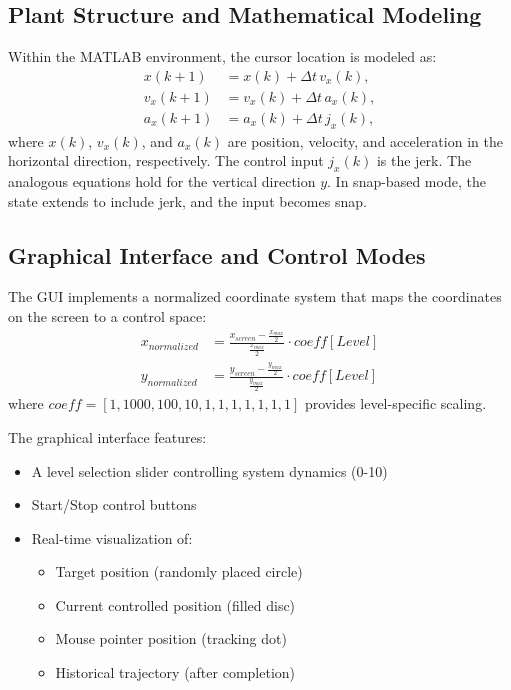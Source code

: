 \documentclass[12pt]{article}
\begin{document}
\subsection{Plant Structure and Mathematical Modeling}
Within the MATLAB environment, the cursor location is modeled as:
\[
\begin{aligned}
x(k+1) &= x(k) + \Delta t \, v_x(k), \\
v_x(k+1) &= v_x(k) + \Delta t \, a_x(k), \\
a_x(k+1) &= a_x(k) + \Delta t \, j_x(k),
\end{aligned}
\]
where $x(k)$, $v_x(k)$, and $a_x(k)$ are position, velocity, and acceleration in the horizontal direction, respectively. The control input $j_x(k)$ is the jerk. The analogous equations hold for the vertical direction $y$. In snap-based mode, the state extends to include jerk, and the input becomes snap.

\subsection{Graphical Interface and Control Modes}
The GUI implements a normalized coordinate system that maps the coordinates on the screen to a control space:
\begin{equation}
\begin{aligned}
x_{normalized} &= \frac{x_{screen} - \frac{x_{max}}{2}}{\frac{x_{max}}{2}} \cdot coeff[Level] \\
y_{normalized} &= \frac{y_{screen} - \frac{y_{max}}{2}}{\frac{y_{max}}{2}} \cdot coeff[Level]
\end{aligned}
\end{equation}
where $coeff = [1, 1000, 100, 10, 1, 1, 1, 1, 1, 1, 1]$ provides level-specific scaling.

The graphical interface features:
\begin{itemize}
\item A level selection slider controlling system dynamics (0-10)
\item Start/Stop control buttons
\item Real-time visualization of:
  \begin{itemize}
  \item Target position (randomly placed circle)
  \item Current controlled position (filled disc)
  \item Mouse pointer position (tracking dot)
  \item Historical trajectory (after completion)
  \end{itemize}
\end{itemize}
\end{document}

